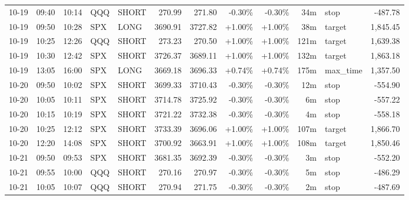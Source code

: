 \documentclass[11pt,a4paper,twoside]{article}
\begin{document}
\begin{center}
\begin{longtable}{>{\color{txtmain}}l l l l l r r r r r >{\color{txtmain}}l r}
10-19 & 09:40 & 10:14 & QQQ & SHORT & 270.99 & 271.80 & \textcolor{lossred}{-0.30\%} & \textcolor{lossred}{-0.30\%} & 34m & stop & \textcolor{lossred}{-487.78} \\
10-19 & 09:50 & 10:28 & SPX & LONG & 3690.91 & 3727.82 & \textcolor{wingreen}{+1.00\%} & \textcolor{wingreen}{+1.00\%} & 38m & target & \textcolor{wingreen}{1,845.45} \\
10-19 & 10:25 & 12:26 & QQQ & SHORT & 273.23 & 270.50 & \textcolor{wingreen}{+1.00\%} & \textcolor{wingreen}{+1.00\%} & 121m & target & \textcolor{wingreen}{1,639.38} \\
10-19 & 10:30 & 12:42 & SPX & SHORT & 3726.37 & 3689.11 & \textcolor{wingreen}{+1.00\%} & \textcolor{wingreen}{+1.00\%} & 132m & target & \textcolor{wingreen}{1,863.18} \\
10-19 & 13:05 & 16:00 & SPX & LONG & 3669.18 & 3696.33 & \textcolor{wingreen}{+0.74\%} & \textcolor{wingreen}{+0.74\%} & 175m & max\_time & \textcolor{wingreen}{1,357.50} \\
10-20 & 09:50 & 10:02 & SPX & SHORT & 3699.33 & 3710.43 & \textcolor{lossred}{-0.30\%} & \textcolor{lossred}{-0.30\%} & 12m & stop & \textcolor{lossred}{-554.90} \\
10-20 & 10:05 & 10:11 & SPX & SHORT & 3714.78 & 3725.92 & \textcolor{lossred}{-0.30\%} & \textcolor{lossred}{-0.30\%} & 6m & stop & \textcolor{lossred}{-557.22} \\
10-20 & 10:15 & 10:19 & SPX & SHORT & 3721.22 & 3732.38 & \textcolor{lossred}{-0.30\%} & \textcolor{lossred}{-0.30\%} & 4m & stop & \textcolor{lossred}{-558.18} \\
10-20 & 10:25 & 12:12 & SPX & SHORT & 3733.39 & 3696.06 & \textcolor{wingreen}{+1.00\%} & \textcolor{wingreen}{+1.00\%} & 107m & target & \textcolor{wingreen}{1,866.70} \\
10-20 & 12:20 & 14:08 & SPX & SHORT & 3700.92 & 3663.91 & \textcolor{wingreen}{+1.00\%} & \textcolor{wingreen}{+1.00\%} & 108m & target & \textcolor{wingreen}{1,850.46} \\
10-21 & 09:50 & 09:53 & SPX & SHORT & 3681.35 & 3692.39 & \textcolor{lossred}{-0.30\%} & \textcolor{lossred}{-0.30\%} & 3m & stop & \textcolor{lossred}{-552.20} \\
10-21 & 09:55 & 10:00 & QQQ & SHORT & 270.16 & 270.97 & \textcolor{lossred}{-0.30\%} & \textcolor{lossred}{-0.30\%} & 5m & stop & \textcolor{lossred}{-486.29} \\
10-21 & 10:05 & 10:07 & QQQ & SHORT & 270.94 & 271.75 & \textcolor{lossred}{-0.30\%} & \textcolor{lossred}{-0.30\%} & 2m & stop & \textcolor{lossred}{-487.69} \\

\end{longtable}
\end{center}
\end{document}
